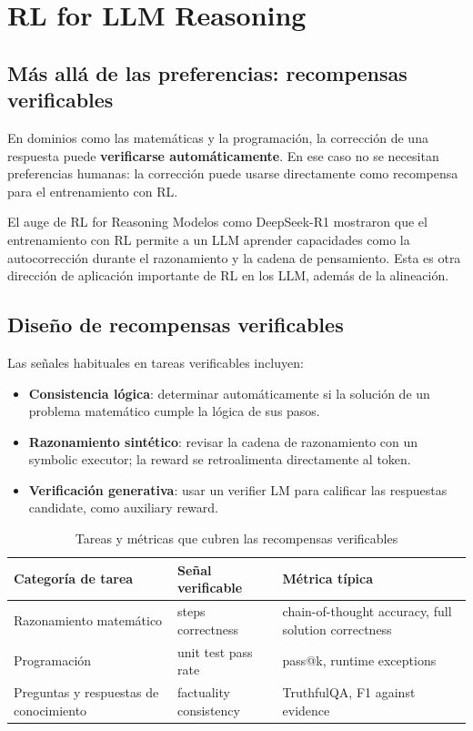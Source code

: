 \section{RL for LLM Reasoning}

\subsection{Más allá de las preferencias: recompensas verificables}

En dominios como las matemáticas y la programación, la corrección de una respuesta puede \textbf{verificarse automáticamente}. En ese caso no se necesitan preferencias humanas: la corrección puede usarse directamente como recompensa para el entrenamiento con RL.

\begin{importantbox}{El auge de RL for Reasoning}
Modelos como DeepSeek-R1 mostraron que el entrenamiento con RL permite a un LLM aprender capacidades como la autocorrección durante el razonamiento y la cadena de pensamiento. Esta es otra dirección de aplicación importante de RL en los LLM, además de la alineación.
\end{importantbox}

\subsection{Diseño de recompensas verificables}

Las señales habituales en tareas verificables incluyen:
\begin{itemize}
    \item \textbf{Consistencia lógica}: determinar automáticamente si la solución de un problema matemático cumple la lógica de sus pasos.
    \item \textbf{Razonamiento sintético}: revisar la cadena de razonamiento con un symbolic executor; la reward se retroalimenta directamente al token.
    \item \textbf{Verificación generativa}: usar un verifier LM para calificar las respuestas candidate, como auxiliary reward.
\end{itemize}

\begin{table}[H]
\centering
\begin{tabular}{p{} p{} p{}}
\toprule
Categoría de tarea & Señal verificable & Métrica típica \\
\midrule
Razonamiento matemático & steps correctness & chain-of-thought accuracy, full solution correctness \\
Programación & unit test pass rate & pass@k, runtime exceptions \\
Preguntas y respuestas de conocimiento & factuality consistency & TruthfulQA, F1 against evidence \\
\bottomrule
\end{tabular}
\caption{Tareas y métricas que cubren las recompensas verificables}
\end{table}

